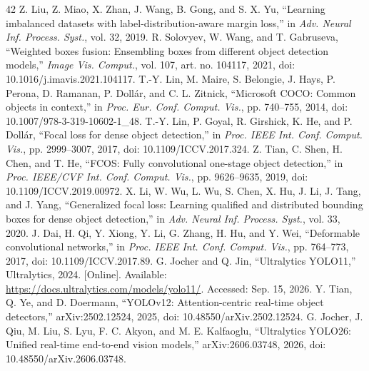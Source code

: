 \documentclass[journal]{IEEEtran}
\begin{document}
\begin{thebibliography}{42}
 Z. Liu, Z. Miao, X. Zhan, J. Wang, B. Gong, and S. X. Yu, ``Learning imbalanced datasets with label-distribution-aware margin loss,'' in \emph{Adv. Neural Inf. Process. Syst.}, vol. 32, 2019.
 R. Solovyev, W. Wang, and T. Gabruseva, ``Weighted boxes fusion: Ensembling boxes from different object detection models,'' \emph{Image Vis. Comput.}, vol. 107, art. no. 104117, 2021, doi: 10.1016/j.imavis.2021.104117.
 T.-Y. Lin, M. Maire, S. Belongie, J. Hays, P. Perona, D. Ramanan, P. Dollár, and C. L. Zitnick, ``Microsoft COCO: Common objects in context,'' in \emph{Proc. Eur. Conf. Comput. Vis.}, pp. 740--755, 2014, doi: 10.1007/978-3-319-10602-1\_48.
 T.-Y. Lin, P. Goyal, R. Girshick, K. He, and P. Dollár, ``Focal loss for dense object detection,'' in \emph{Proc. IEEE Int. Conf. Comput. Vis.}, pp. 2999--3007, 2017, doi: 10.1109/ICCV.2017.324.
 Z. Tian, C. Shen, H. Chen, and T. He, ``FCOS: Fully convolutional one-stage object detection,'' in \emph{Proc. IEEE/CVF Int. Conf. Comput. Vis.}, pp. 9626--9635, 2019, doi: 10.1109/ICCV.2019.00972.
 X. Li, W. Wu, L. Wu, S. Chen, X. Hu, J. Li, J. Tang, and J. Yang, ``Generalized focal loss: Learning qualified and distributed bounding boxes for dense object detection,'' in \emph{Adv. Neural Inf. Process. Syst.}, vol. 33, 2020.
 J. Dai, H. Qi, Y. Xiong, Y. Li, G. Zhang, H. Hu, and Y. Wei, ``Deformable convolutional networks,'' in \emph{Proc. IEEE Int. Conf. Comput. Vis.}, pp. 764--773, 2017, doi: 10.1109/ICCV.2017.89.
 G. Jocher and Q. Jin, ``Ultralytics YOLO11,'' Ultralytics, 2024. [Online]. Available: \url{https://docs.ultralytics.com/models/yolo11/}. Accessed: Sep. 15, 2026.
 Y. Tian, Q. Ye, and D. Doermann, ``YOLOv12: Attention-centric real-time object detectors,'' arXiv:2502.12524, 2025, doi: 10.48550/arXiv.2502.12524.
 G. Jocher, J. Qiu, M. Liu, S. Lyu, F. C. Akyon, and M. E. Kalfaoglu, ``Ultralytics YOLO26: Unified real-time end-to-end vision models,'' arXiv:2606.03748, 2026, doi: 10.48550/arXiv.2606.03748.
\end{thebibliography}
\end{document}
